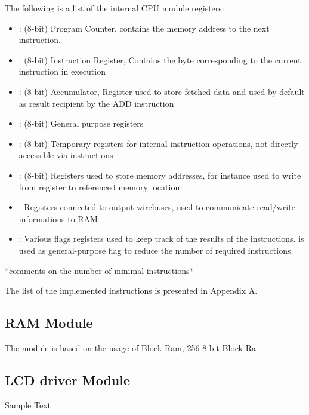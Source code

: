 The following is a list of the internal CPU module registers:
\begin{itemize}
    \item {}: (8-bit) Program Counter, contains the memory address to the next instruction.
    \item {}: (8-bit) Instruction Register, Contains the byte corresponding to the current instruction in execution
    \item {}: (8-bit) Accumulator, Register used to store fetched data and used by default as result recipient by the ADD instruction
    \item {}: (8-bit) General purpose registers
    \item {}: (8-bit) Temporary registers for internal instruction operations, not directly accessible via instructions
    \item {}: (8-bit) Registers used to store memory addresses, for instance used to write from register to referenced memory location
    \item {}: Registers connected to output wirebuses, used to communicate read/write informations to RAM
    \item {}: Various flags registers used to keep track of the results of the instructions.
     is used as general-purpose flag to reduce the number of required instructions.
\end{itemize}

*comments on the number of minimal instructions*

The list of the implemented instructions is presented in Appendix A.

\subsection{RAM Module}  \label{ssec:ram}
The  module is based on the usage of Block Ram,  256 8-bit Block-Ra

\subsection{LCD driver Module}  \label{ssec:lcd}
Sample Text \cite{OurWork}